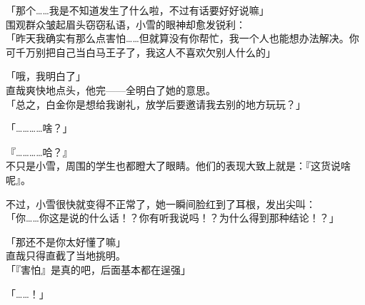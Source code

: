 「那个……我是不知道发生了什么啦，不过有话要好好说嘛」\\

围观群众皱起眉头窃窃私语，小雪的眼神却愈发锐利：\\

「昨天我确实有那么点害怕……但就算没有你帮忙，我一个人也能想办法解决。你可千万别把自己当白马王子了，我这人不喜欢欠别人什么的」

「哦，我明白了」\\

直哉爽快地点头，他完——全明白了她的意思。\\

「总之，白金你是想给我谢礼，放学后要邀请我去别的地方玩玩？」

「…………啥？」

『…………哈？』\\

不只是小雪，周围的学生也都瞪大了眼睛。他们的表现大致上就是：『这货说啥呢』。

不过，小雪很快就变得不正常了，她一瞬间脸红到了耳根，发出尖叫：\\

「你……你这是说的什么话！？你有听我说吗！？为什么得到那种结论！？」

「那还不是你太好懂了嘛」\\

直哉只得直截了当地挑明。\\

「『害怕』是真的吧，后面基本都在逞强」

「……！」

